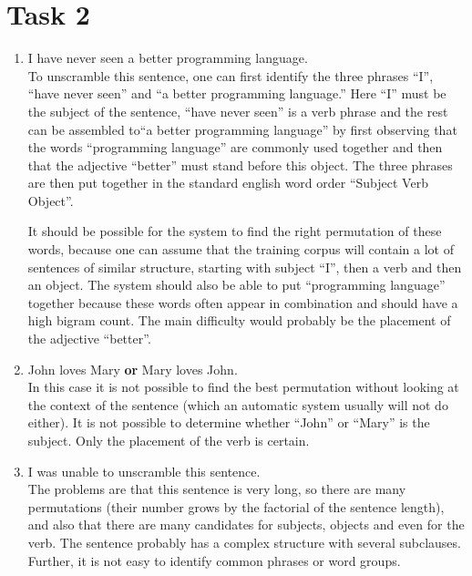 \documentclass[%
   11pt,              %
   ngerman,           %
   a4paper,           %
   DIV11,             %
]{scrartcl}%
\begin{document}
\section*{Task 2}
\begin{enumerate}
	\item I have never seen a better programming language. \\
	To unscramble this sentence, one can first identify the three phrases ``I'', ``have never seen'' and ``a better programming language.'' Here ``I'' must be the subject of the sentence, ``have never seen'' is a verb phrase and the rest can be assembled to``a better programming language'' by first observing that the words ``programming language'' are commonly used together and then that the adjective ``better'' must stand before this object. The three phrases are then put together in the standard english word order ``Subject Verb Object''. \par
	It should be possible for the system to find the right permutation of these words, because one can assume that the training corpus will contain a lot of sentences of similar structure, starting with subject ``I'', then a verb and then an object. The system should also be able to put ``programming language'' together because these words often appear in combination and should have a high bigram count. The main difficulty would probably be the placement of the adjective ``better''. 
	\item John loves Mary \textbf{or} Mary loves John. \\
	In this case it is not possible to find the best permutation without looking at the context of the sentence (which an automatic system usually will not do either). It is not possible to determine whether ``John'' or ``Mary'' is the subject. Only the placement of the verb is certain.
	\item I was unable to unscramble this sentence. \\
	The problems are that this sentence is very long, so there are many permutations (their number grows by the factorial of the sentence length), and also that there are many candidates for subjects, objects and even for the verb. The sentence probably has a complex structure with several subclauses. Further, it is not easy to identify common phrases or word groups.
\end{enumerate}
\end{document}
